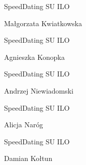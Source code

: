 \documentclass[a4paper,12pt]{article}
\begin{document}
\begin{minipage}[c]{\textwidth}
  \hline

  \hspace{0.5cm}

  SpeedDating SU ILO

  Małgorzata Kwiatkowska

  \hspace{0.5cm}

  \hline
\end{minipage}



\begin{minipage}[c]{\textwidth}
  \hline

  \hspace{0.5cm}

  SpeedDating SU ILO

  Agnieszka Konopka

  \hspace{0.5cm}

  \hline
\end{minipage}



\begin{minipage}[c]{\textwidth}
  \hline

  \hspace{0.5cm}

  SpeedDating SU ILO

  Andrzej Niewiadomski

  \hspace{0.5cm}

  \hline
\end{minipage}



\begin{minipage}[c]{\textwidth}
  \hline

  \hspace{0.5cm}

  SpeedDating SU ILO

  Alicja Naróg

  \hspace{0.5cm}

  \hline
\end{minipage}



\begin{minipage}[c]{\textwidth}
  \hline

  \hspace{0.5cm}

  SpeedDating SU ILO

  Damian Kołtun

  \hspace{0.5cm}

  \hline
\end{minipage}
\end{document}
